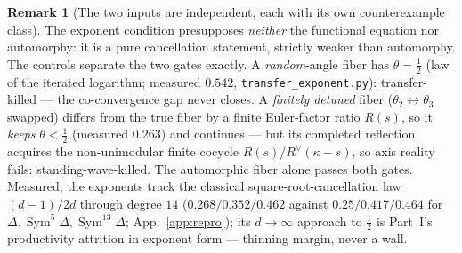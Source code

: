 \documentclass[11pt]{article}
\theoremstyle{definition}
\newtheorem{remark}[theorem]{Remark}
\newcommand{\Sym}{\operatorname{Sym}}
\begin{document}
\begin{remark}[The two inputs are independent, each with its own counterexample class]\label{rem:twogates}
The exponent condition presupposes \emph{neither} the functional equation nor automorphy: it is a pure
cancellation statement, strictly weaker than automorphy. The controls separate the two gates exactly. A
\emph{random}-angle fiber has $\theta=\tfrac12$ (law of the iterated logarithm; measured $0.542$,
\texttt{transfer\_exponent.py}): transfer-killed --- the co-convergence gap never closes. A \emph{finitely
detuned} fiber ($\theta_2\leftrightarrow\theta_3$ swapped) differs from the true fiber by a finite
Euler-factor ratio $R(s)$, so it \emph{keeps} $\theta<\tfrac12$ (measured $0.263$) and continues --- but its
completed reflection acquires the non-unimodular finite cocycle $R(s)/R^\vee(\kappa-s)$, so axis reality
fails: standing-wave-killed. The automorphic fiber alone passes both gates. Measured, the exponents track the
classical square-root-cancellation law $(d-1)/2d$ through degree $14$ ($0.268/0.352/0.462$ against
$0.25/0.417/0.464$ for $\Delta,\Sym^5\Delta,\Sym^{13}\Delta$; App.~\ref{app:repro}); its
$d\to\infty$ approach to $\tfrac12$ is Part~I's productivity attrition in exponent form --- thinning margin,
never a wall.
\end{remark}
\end{document}
